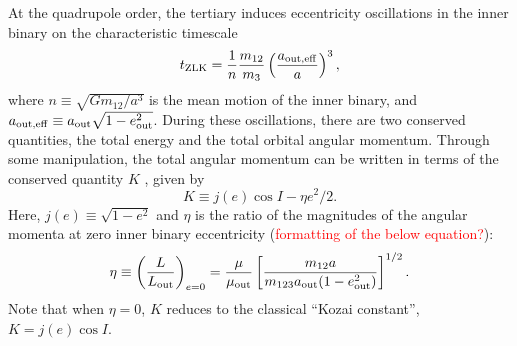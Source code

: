 \documentclass[
        fleqn,
        usenatbib,
    ]{mnras}
\newcommand*{\p}[1]{\left(#1\right)}
\newcommand*{\s}[1]{\left[#1\right]}
\begin{document}
At the quadrupole order, the tertiary induces eccentricity oscillations in the
inner binary on the characteristic timescale
\begin{equation}
    t_{\rm ZLK} = \frac{1}{n}\frac{m_{12}}{m_3}
            \p{\frac{a_{\rm out, eff}}{a}}^3,\label{eq:def_tzlk}
\end{equation}
where $n \equiv \sqrt{Gm_{12} / a^3}$ is the mean motion of the inner binary,
and $a_{\rm out, eff} \equiv a_{\rm out}\sqrt{1 - e_{\rm out}^2}$. During these
oscillations, there are two conserved quantities, the total energy and the total
orbital angular momentum. Through some manipulation, the total angular momentum
can be written in terms of the conserved quantity $K$ \citep{LML15}, given by
\begin{equation}
    K \equiv j(e) \cos I - \eta e^2 / 2. \label{eq:def_K}
\end{equation}
Here, $j(e) \equiv \sqrt{1 - e^2}$ and $\eta$ is the ratio of the magnitudes of
the angular momenta at zero inner binary eccentricity
(\textcolor{red}{formatting of the below equation?}):
\begin{equation}
    \eta \equiv \p{\frac{L}{L_{\rm out}}}_{e = 0}
        = \frac{\mu}{\mu_{\rm out}}\s{\frac{m_{12}a}
            {m_{123}a_{\rm out}(1 - e_{\rm out}^2)}}^{1/2}.\label{eq:def_eta}
\end{equation}
Note that when $\eta = 0$, $K$ reduces to the classical ``Kozai constant'', $K =
j(e) \cos I$.
\end{document}
